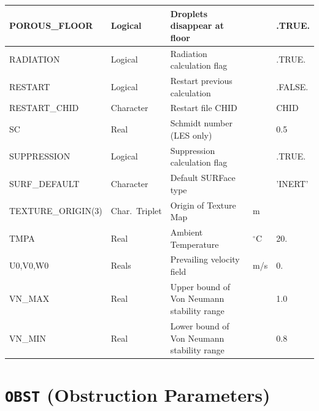 \documentclass[11pt]{book}
\begin{document}
\begin{table}[H]
\begin{tabular*}{\textwidth}{@{\extracolsep{\fill}}|l|l|l|l|l|}
{\ct POROUS\_FLOOR}         & Logical       & Droplets disappear at floor                   &               & {\ct .TRUE.}      \\ \hline
{\ct RADIATION}             & Logical       & Radiation calculation flag                    &               & {\ct .TRUE.}      \\ \hline
{\ct RESTART}               & Logical       & Restart previous calculation                  &               & {\ct .FALSE.}     \\ \hline
{\ct RESTART\_CHID}         & Character     & Restart file CHID                             &               & {\ct CHID}        \\ \hline
{\ct SC}                    & Real          & Schmidt number (LES only)                     &               & 0.5               \\ \hline
{\ct SUPPRESSION}           & Logical       & Suppression calculation flag                  &               & {\ct .TRUE.}      \\ \hline
{\ct SURF\_DEFAULT}         & Character     & Default SURFace type                          &               & {\ct 'INERT'}     \\ \hline
{\ct TEXTURE\_ORIGIN(3)}    & Char.~Triplet & Origin of Texture Map                         & m             &                   \\ \hline
{\ct TMPA}                  & Real          & Ambient Temperature                           & $^\circ$C     & 20.               \\ \hline
{\ct U0,V0,W0}              & Reals         & Prevailing velocity field                     & m/s           & 0.                \\ \hline
{\ct VN\_MAX}               & Real          & Upper bound of Von Neumann stability range    &               & 1.0               \\ \hline
{\ct VN\_MIN}               & Real          & Lower bound of Von Neumann stability range    &               & 0.8               \\ \hline
\end{tabular*}
\end{table}

\vspace{\baselineskip}

\vfill


\section{\texorpdfstring{{\tt OBST}}{OBST} (Obstruction Parameters)}
\end{document}
